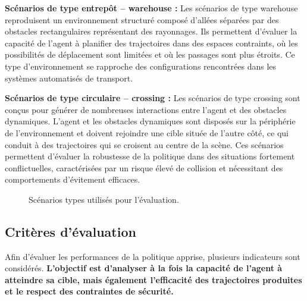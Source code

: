 \vspace{10pt}

\noindent \textbf{Scénarios de type entrepôt -- warehouse :} Les scénarios de type warehouse reproduisent un environnement structuré composé d'allées séparées par des obstacles rectangulaires représentant des rayonnages. Ils permettent d'évaluer la capacité de l'agent à planifier des trajectoires dans des espaces contraints, où les possibilités de déplacement sont limitées et où les passages sont plus étroits. Ce type d'environnement se rapproche des configurations rencontrées dans les systèmes automatisés de transport.

\vspace{10pt}

\noindent \textbf{Scénarios de type circulaire -- crossing :} Les scénarios de type crossing sont conçus pour générer de nombreuses interactions entre l'agent et des obstacles dynamiques. L'agent et les obstacles dynamiques sont disposés sur la périphérie de l'environnement et doivent rejoindre une cible située de l'autre côté, ce qui conduit à des trajectoires qui se croisent au centre de la scène. Ces scénarios permettent d'évaluer la robustesse de la politique dans des situations fortement conflictuelles, caractérisées par un risque élevé de collision et nécessitant des comportements d'évitement efficaces.

\begin{figure}[h]
    \centering
    \caption{Scénarios types utilisés pour l'évaluation.}
    \label{fig:eval_scenarios}
\end{figure}




\subsection{Critères d'évaluation}

\noindent Afin d'évaluer les performances de la politique apprise, plusieurs indicateurs sont considérés. \textbf{L'objectif est d'analyser à la fois la capacité de l'agent à atteindre sa cible, mais également l'efficacité des trajectoires produites et le respect des contraintes de sécurité.}

